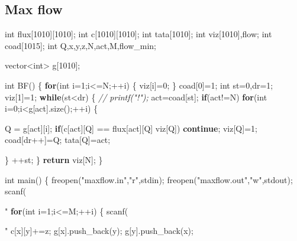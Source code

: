 \documentclass[10pt,]{article}
\newenvironment{Shaded}{}{}
\newcommand{\KeywordTok}[1]{\textcolor[rgb]{0.00,0.44,0.13}{\textbf{{#1}}}}
\newcommand{\DataTypeTok}[1]{\textcolor[rgb]{0.56,0.13,0.00}{{#1}}}
\newcommand{\DecValTok}[1]{\textcolor[rgb]{0.25,0.63,0.44}{{#1}}}
\newcommand{\StringTok}[1]{\textcolor[rgb]{0.25,0.44,0.63}{{#1}}}
\newcommand{\CommentTok}[1]{\textcolor[rgb]{0.38,0.63,0.69}{\textit{{#1}}}}
\newcommand{\NormalTok}[1]{{#1}}
\begin{document}
\subsection{Max flow}

\begin{Shaded}
\begin{Highlighting}[]
\DataTypeTok{int} \NormalTok{flux[}\DecValTok{1010}\NormalTok{][}\DecValTok{1010}\NormalTok{];}
\DataTypeTok{int} \NormalTok{c[}\DecValTok{1010}\NormalTok{][}\DecValTok{1010}\NormalTok{];}
\DataTypeTok{int} \NormalTok{tata[}\DecValTok{1010}\NormalTok{];}
\DataTypeTok{int} \NormalTok{viz[}\DecValTok{1010}\NormalTok{],flow;}
\DataTypeTok{int} \NormalTok{coad[}\DecValTok{1015}\NormalTok{];}
\DataTypeTok{int} \NormalTok{Q,x,y,z,N,act,M,flow_min;}

\NormalTok{vector<}\DataTypeTok{int}\NormalTok{> g[}\DecValTok{1010}\NormalTok{];}

\DataTypeTok{int} \NormalTok{BF()}
\NormalTok{\{}
  \KeywordTok{for}\NormalTok{(}\DataTypeTok{int} \NormalTok{i=}\DecValTok{1}\NormalTok{;i<=N;++i) \{}
    \NormalTok{viz[i]=}\DecValTok{0}\NormalTok{;}
  \NormalTok{\}}
  \NormalTok{coad[}\DecValTok{0}\NormalTok{]=}\DecValTok{1}\NormalTok{;}
  \DataTypeTok{int} \NormalTok{st=}\DecValTok{0}\NormalTok{,dr=}\DecValTok{1}\NormalTok{;}
  \NormalTok{viz[}\DecValTok{1}\NormalTok{]=}\DecValTok{1}\NormalTok{;}
  \KeywordTok{while}\NormalTok{(st<dr)}
  \NormalTok{\{}
    \CommentTok{// printf("!");}
    \NormalTok{act=coad[st];}
    \KeywordTok{if}\NormalTok{(act!=N)}
      \KeywordTok{for}\NormalTok{(}\DataTypeTok{int} \NormalTok{i=}\DecValTok{0}\NormalTok{;i<g[act].size();++i)}
      \NormalTok{\{}

        \NormalTok{Q = g[act][i];}
        \KeywordTok{if}\NormalTok{(c[act][Q] == flux[act][Q] \textbar{}\textbar{} viz[Q])}
          \KeywordTok{continue}\NormalTok{;}
        \NormalTok{viz[Q]=}\DecValTok{1}\NormalTok{;}
        \NormalTok{coad[dr++]=Q;}
        \NormalTok{tata[Q]=act;}

      \NormalTok{\}}
    \NormalTok{++st;}
  \NormalTok{\}}
  \KeywordTok{return} \NormalTok{viz[N];}
\NormalTok{\}}

\DataTypeTok{int} \NormalTok{main()}
\NormalTok{\{}
  \NormalTok{freopen(}\StringTok{"maxflow.in"}\NormalTok{,}\StringTok{"r"}\NormalTok{,stdin);}
  \NormalTok{freopen(}\StringTok{"maxflow.out"}\NormalTok{,}\StringTok{"w"}\NormalTok{,stdout);}
  \NormalTok{scanf(}\StringTok{"%d%d"}\NormalTok{,&N,&M);}
  \KeywordTok{for}\NormalTok{(}\DataTypeTok{int} \NormalTok{i=}\DecValTok{1}\NormalTok{;i<=M;++i)}
  \NormalTok{\{}
    \NormalTok{scanf(}\StringTok{"%d%d%d"}\NormalTok{,&x,&y,&z);}
    \NormalTok{c[x][y]+=z;}
    \NormalTok{g[x].push_back(y);}
    \NormalTok{g[y].push_back(x);}

}}
\end{Highlighting}
\end{Shaded}
\end{document}
